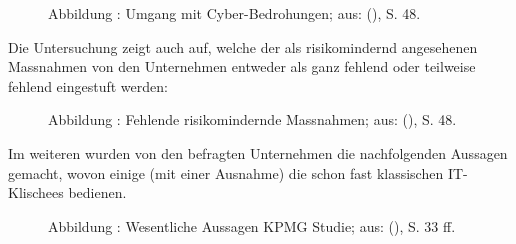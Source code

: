 \documentclass[../../main.tex]{subfiles}
\begin{document}
\addtocounter{figure}{1}
\begin{figure}[H]
    
    \vspace*{-5mm}
    \caption*{Abbildung \thefigure: Umgang mit Cyber-Bedrohungen; aus: \citeauthor{bossart_clarity_2016} (\citeyear{bossart_clarity_2016}), S. 48.}
    \label{fig:managecyberthreat}
\end{figure}

Die Untersuchung zeigt auch auf, welche der als risikomindernd angesehenen Massnahmen von den Unternehmen entweder als ganz fehlend oder teilweise fehlend eingestuft werden:

\addtocounter{figure}{1}
\begin{figure}[H]
    
    \vspace*{-5mm}
    \caption*{Abbildung \thefigure: Fehlende risikomindernde Massnahmen; aus: \citeauthor{bossart_clarity_2016} (\citeyear{bossart_clarity_2016}), S. 48.}
    \label{fig:missingmeasures}
\end{figure}

Im weiteren wurden von den befragten Unternehmen die nachfolgenden Aussagen gemacht, wovon einige (mit einer Ausnahme) die schon fast klassischen IT-Klischees bedienen.

\addtocounter{figure}{1}
\begin{figure}[H]
    
    \caption*{Abbildung \thefigure: Wesentliche Aussagen KPMG Studie; aus: \citeauthor{bossart_clarity_2016} (\citeyear{bossart_clarity_2016}), S. 33 ff.}
    \label{fig:keyfindings}
\end{figure}
\end{document}
